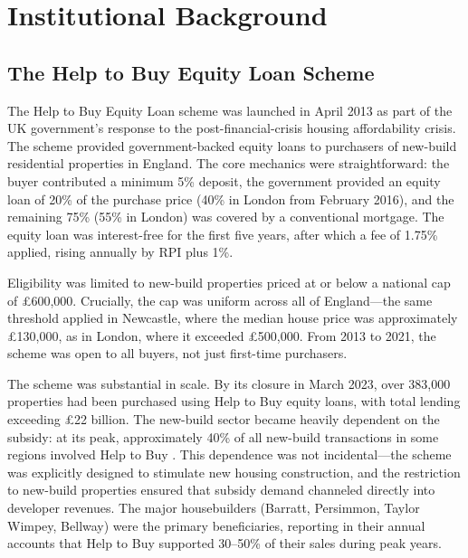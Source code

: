 \documentclass[12pt]{article}
\begin{document}
\section{Institutional Background}\label{sec:background}

\subsection{The Help to Buy Equity Loan Scheme}

The Help to Buy Equity Loan scheme was launched in April 2013 as part of the UK government's response to the post-financial-crisis housing affordability crisis. The scheme provided government-backed equity loans to purchasers of new-build residential properties in England. The core mechanics were straightforward: the buyer contributed a minimum 5\% deposit, the government provided an equity loan of 20\% of the purchase price (40\% in London from February 2016), and the remaining 75\% (55\% in London) was covered by a conventional mortgage. The equity loan was interest-free for the first five years, after which a fee of 1.75\% applied, rising annually by RPI plus 1\%.

Eligibility was limited to new-build properties priced at or below a national cap of \pounds600,000. Crucially, the cap was uniform across all of England---the same threshold applied in Newcastle, where the median house price was approximately \pounds130,000, as in London, where it exceeded \pounds500,000. From 2013 to 2021, the scheme was open to all buyers, not just first-time purchasers.

The scheme was substantial in scale. By its closure in March 2023, over 383,000 properties had been purchased using Help to Buy equity loans, with total lending exceeding \pounds22 billion. The new-build sector became heavily dependent on the subsidy: at its peak, approximately 40\% of all new-build transactions in some regions involved Help to Buy \citep{mhclg2017evaluation}. This dependence was not incidental---the scheme was explicitly designed to stimulate new housing construction, and the restriction to new-build properties ensured that subsidy demand channeled directly into developer revenues. The major housebuilders (Barratt, Persimmon, Taylor Wimpey, Bellway) were the primary beneficiaries, reporting in their annual accounts that Help to Buy supported 30--50\% of their sales during peak years.
\end{document}

